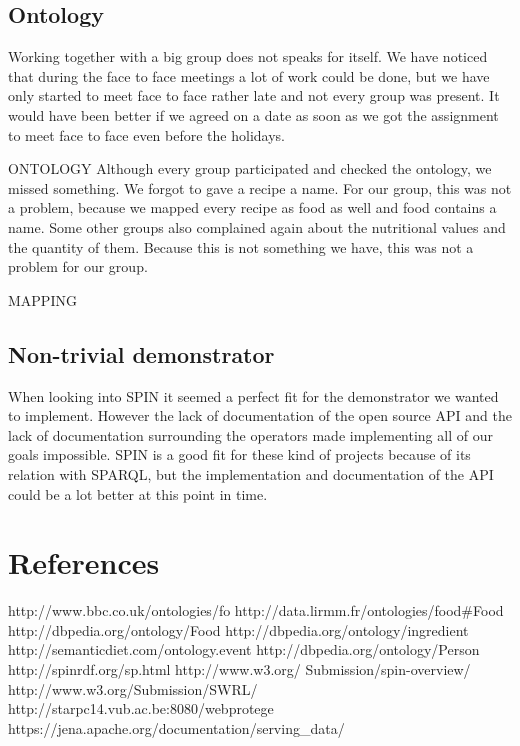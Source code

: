 \subsection*{Ontology} 
Working together with a big group does not speaks for itself. We have noticed that during the face to face meetings a lot of work could be done, but we have only started to meet face to face rather late and not every group was present. It would have been better if we agreed on a date as soon as we got the assignment to meet face to face even before the holidays.  

ONTOLOGY
Although every group participated and checked the ontology, we missed something. We forgot to gave a recipe a name. For our group, this was not a problem, because we mapped every recipe as food as well and food contains a name. Some other groups also complained again about the nutritional values and the quantity of them. Because this is not something we have, this was not a problem for our group. 

MAPPING

\subsection{Non-trivial demonstrator}
When looking into SPIN it seemed a perfect fit for the demonstrator we wanted to implement. However the lack of documentation of the open source API and the lack of documentation surrounding the operators made implementing all of our goals impossible. SPIN is a good fit for these kind of projects because of its relation with SPARQL, but the implementation and documentation of the API could be a lot better at this point in time.

\section*{References}
http://www.bbc.co.uk/ontologies/fo\newline
http://data.lirmm.fr/ontologies/food\#Food\newline
http://dbpedia.org/ontology/Food \newline
http://dbpedia.org/ontology/ingredient\newline
http://semanticdiet.com/ontology.event \newline
http://dbpedia.org/ontology/Person \newline
http://spinrdf.org/sp.html\newline
http://www.w3.org/
Submission/spin-overview/\newline
http://www.w3.org/Submission/SWRL/\newline
http://starpc14.vub.ac.be:8080/webprotege \newline
https://jena.apache.org/documentation/serving\_data/

